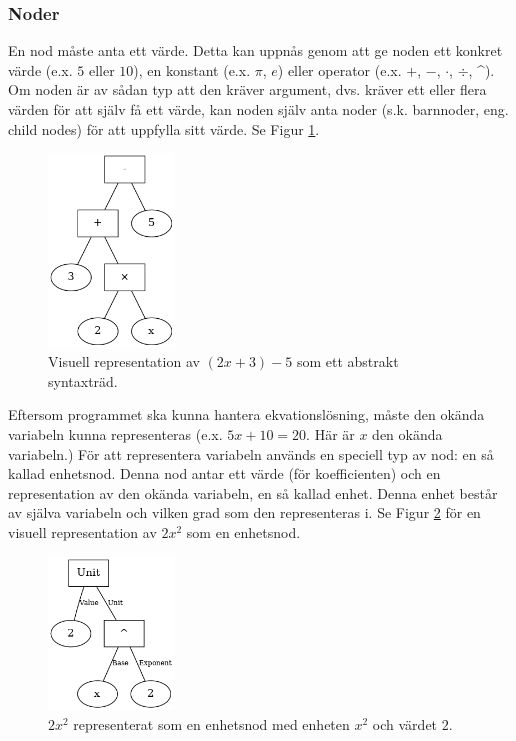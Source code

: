 \documentclass[12pt,a4paper]{article}
\begin{document}
\subsubsection{Noder}
\label{subsubsec:noder}
En nod måste anta ett värde. Detta kan uppnås genom att ge noden ett konkret värde (e.x. \(5\) eller \(10\)), en konstant (e.x. \(\pi\), \(e\)) eller operator (e.x. \(+\), \(-\), \(\cdot\), \(\div\), \string^). Om noden är av sådan typ att den kräver argument, dvs. kräver ett eller flera värden för att själv få ett värde, kan noden själv anta noder (s.k. barnnoder, eng. child nodes) för att uppfylla sitt värde. Se Figur \ref{fig:2131}.
\begin{figure}[h]
  \centering
  \includegraphics[width=0.3\textwidth]{image24}
  \caption{Visuell representation av \((2x + 3) - 5\) som ett abstrakt syntaxträd.}
  \label{fig:2131}
\end{figure}
Eftersom programmet ska kunna hantera ekvationslösning, måste den okända variabeln kunna representeras (e.x. \(5x + 10 = 20\). Här är \(x\) den okända variabeln.) För att representera variabeln används en speciell typ av nod: en så kallad enhetsnod. Denna nod antar ett värde (för koefficienten) och en representation av den okända variabeln, en så kallad enhet. Denna enhet består av själva variabeln och vilken grad som den representeras i. Se Figur \ref{fig:2132} för en visuell representation av \(2x^{2}\) som en enhetsnod.
\begin{figure}[h]
  \centering
  \includegraphics[width=0.3\textwidth]{image25}
  \caption{\(2x^{2}\) representerat som en enhetsnod med enheten \(x^{2}\) och värdet \(2\).}
  \label{fig:2132}
\end{figure}
\end{document}
